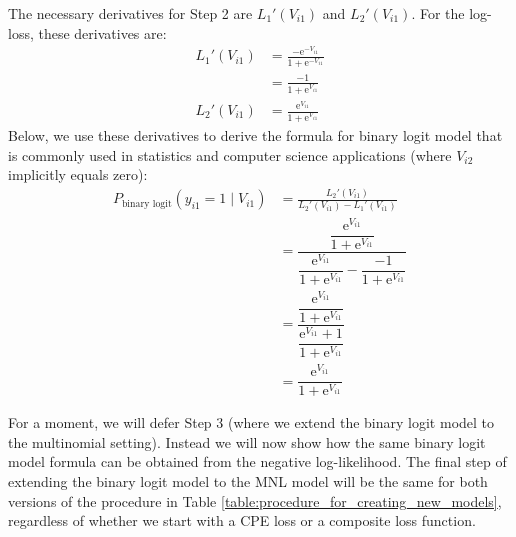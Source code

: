 The necessary derivatives for Step 2 are $L_{1}' \left( V_{i1} \right)$ and $ L_{2}' \left( V_{i1} \right)$. For the log-loss, these derivatives are:
\begin{equation*}
\begin{aligned}
L_{1}' \left( V_{i1} \right) &= \frac{- \mathrm{e}^{-V_{i1}}}{1 + \mathrm{e}^{-V_{i1}}}\\
&= \frac{-1}{1 + \mathrm{e}^{V_{i1}}} \\
L_{2}' \left( V_{i1} \right) &=  \frac{ \mathrm{e}^{V_{i1}}}{1 + \mathrm{e}^{V_{i1}}}
\end{aligned}
\end{equation*}
Below, we use these derivatives to derive the formula for binary logit model that is commonly used in statistics and computer science applications (where $V_{i2}$ implicitly equals zero):
\begin{equation}\tag{C1}
\label{eq:binary_logit}
\begin{aligned}
P_{ \textrm{binary logit} } \left( y_{i1} = 1 \mid V_{i1} \right) &= \frac{ L_{2}' \left( V_{i1} \right) }{ L_{2}' \left( V_{i1} \right) - L_{1}' \left( V_{i1} \right) } \\
&= \dfrac{ \dfrac{ \mathrm{e}^{V_{i1}}}{1 + \mathrm{e}^{V_{i1}}}} { \dfrac{ \mathrm{e}^{V_{i1}}}{1 + \mathrm{e}^{V_{i1}}} - \dfrac{-1}{1 + \mathrm{e}^{V_{i1}}} } \\
&= \dfrac{ \dfrac{ \mathrm{e}^{V_{i1}}}{1 + \mathrm{e}^{V_{i1}}}} { \dfrac{ \mathrm{e}^{V_{i1}} + 1}{ 1 + \mathrm{e}^{V_{i1}}}  } \\
&= \dfrac{ \mathrm{e}^{V_{i1}} }{ 1 + \mathrm{e}^{V_{i1}} }
\end{aligned}
\end{equation}

For a moment, we will defer Step 3 (where we extend the binary logit model to the multinomial setting). Instead we will now show how the same  binary logit model formula can be obtained from the negative log-likelihood. The final step of extending the binary logit model to the MNL model will be the same for both versions of the procedure in Table \ref{table:procedure_for_creating_new_models}, regardless of whether we start with a CPE loss or a composite loss function.


